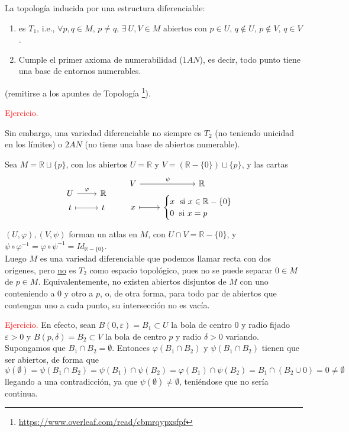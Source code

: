 \begin{prop}
La topología inducida por una estructura diferenciable: \vspace{-3mm}
\begin{enumerate}
    \item es $T_1$, i.e., $\forall p,q \in M, \, p \neq q, \, \exists \: U, V \in M \text{ abiertos con } p \in U, \, q \nin U, \, p \nin V, \, q \in V $.
    \item Cumple el primer axioma de numerabilidad ($1AN$), es decir, todo punto tiene una base de entornos numerables.
\end{enumerate} (remitirse a los apuntes de Topología \footnote{\url{https://www.overleaf.com/read/cbmrqypxsfpf}}).
\end{prop}
\begin{dem}
    \textcolor{red}{Ejercicio.}
\end{dem}
Sin embargo, una variedad diferenciable no siempre es $T_2$ (no teniendo unicidad en los l\'imites) o $2AN$ (no tiene una base de abiertos numerable).
\begin{ejem}
Sea $M = \mathbb{R} \sqcup \{p\}$, con los abiertos $U=\mathbb{R}$ y $V = (\mathbb{R}-\{0\}) \sqcup \{p\}$, y las cartas $$\begin{tikzcd}
U \arrow{r}{\varphi} & \mathbb{R}\\[-5mm]
t \arrow[mapsto]{r} & t
\end{tikzcd} \qquad \begin{tikzcd}
V \arrow{r}{\psi} & \mathbb{R}\\[-5mm]
x \arrow[mapsto]{r} & \begin{cases} 
x \;\text{ si } x\in \mathbb{R}-\{0\}\\
 0 \;\text{ si } x = p \end{cases}
\end{tikzcd}$$
$(U,\varphi),(V,\psi)$ forman un atlas en $M$, con $U \cap V = \mathbb{R}-\{0\}$, y $\psi \circ \varphi^{-1} = \varphi \circ \psi^{-1} = Id_{\mathbb{R}-\{0\}}$. \\
Luego $M$ es una variedad diferenciable que podemos llamar recta con dos orígenes, pero \underline{no} es $T_2$ como espacio topológico, pues no se puede separar $0 \in M$ de $p \in M$. Equivalentemente, no existen abiertos disjuntos de $M$ con uno conteniendo a $0$ y otro a $p$, o, de otra forma, para todo par de abiertos que contengan uno a cada punto, su intersección no es vacía.
\begin{dem} \textcolor{red}{Ejercicio.}
En efecto, sean $B(0,\varepsilon)=B_1 \subset U$ la bola de centro $0$ y radio fijado $\varepsilon > 0$ y $B(p,\delta)=B_2 \subset V$ la bola de centro $p$ y radio $\delta > 0$ variando. Supongamos que $B_1 \cap B_2 =\emptyset$. Entonces $\varphi(B_1 \cap B_2)$ y $\psi(B_1 \cap B_2)$ tienen que ser abiertos, de forma que 
$$\psi(\emptyset) = \psi(B_1 \cap B_2) = \psi(B_1) \cap \psi(B_2) =\varphi(B_1) \cap \psi(B_2) =B_1 \cap (B_2 \cup 0) = 0 \neq \emptyset$$
llegando a una contradicci\'on, ya que $\psi(\emptyset) \neq \emptyset$, teni\'endose que no ser\'ia continua. 
\end{dem}
\end{ejem}

